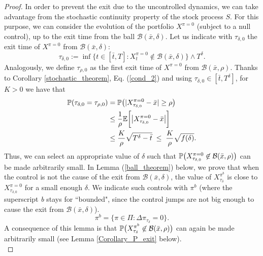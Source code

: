 \begin{proof}
In order to prevent the exit due to the uncontrolled dynamics, we can take advantage from the stochastic continuity property of the stock process $S$. 
For this purpose, we can 
consider the evolution of the portfolio $X^{\pi=0}$ (subject to a null control), up to the exit time from the ball $ \mathcal{B}(\bar x, \delta) $. 
Let us indicate with $\tau_{\delta,0}$ the exit time of $X^{\pi=0}$ from $ \mathcal{B}(\bar x, \delta) $:
\begin{equation}\label{tau_delta}
 \tau_{\delta,0} := \inf \{ t \in [\bar t, T] : X^{\pi=0}_t \not \in \mathcal{B}(\bar x, \delta) \} \wedge T^{\delta}.
\end{equation}
Analogously, we define $\tau_{\rho,0}$ as the first exit time of $X^{\pi=0}$ from $ \mathcal{B}(\bar x, \rho) $.
Thanks to Corollary \ref{stochastic_theorem}, Eq. (\ref{cond_2}) and using $\tau_{\delta,0} \in [\bar t, T^{\delta}]$, for $K>0$ we have that 
\begin{align}\label{P_X_0}
 \mathbb{P}(\tau_{\delta,0} = \tau_{\rho,0} ) &= \mathbb{P} \bigl( |X^{\pi=0}_{\tau_{\delta,0}} - \bar x| \geq \rho \bigr) \\ \nonumber
   & \leq \frac{1}{\rho} \mathbb{E} \biggl[ \big| X^{\pi=0}_{\tau_{\delta,0}} - \bar x \big| \biggr] \\ \nonumber
   & \leq \frac{K}{\rho} \sqrt{T^{\delta} - \bar t} \; \leq \;  \frac{K}{\rho}\sqrt{f(\delta)} .
\end{align} 
Thus, we can select an appropriate value of $\delta$ such that $\mathbb{P} \bigl( X^{\pi=0}_{\tau_{\delta,0}} \not \in \mathcal{B}(\bar x, \rho) \bigr) $ 
can be made arbitrarily small.
In Lemma (\ref{ball_theorem}) below, we prove that when the 
control is not the cause of the exit from $\mathcal{B}(\bar x, \delta)$,  
the value of $X^{\pi^b}_{\tau_{\delta}}$ is close to $X^{\pi=0}_{\tau_{\delta,0}}$ for a small enough $\delta$. 
We indicate such controls with $\pi^b$ (where the superscript \emph{b} stays for ``bounded", since the control 
jumps are not big enough to cause the exit from $\mathcal{B}(\bar x, \delta)$). 
\begin{equation}\label{bounded_controls}
 \pi^b = \bigl\{ \pi \in \Pi : \Delta \pi_{\tau_{\delta}} = 0 \bigr\}. 
\end{equation}
A consequence of this lemma is that $\mathbb{P} \bigl( X^{\pi^b}_{\tau_{\delta}} \not \in \mathcal{B}(\bar x, \rho) \bigr)$ can again be made arbitrarily small (see Lemma 
\ref{Corollary_P_exit} below).\\


\end{proof}
